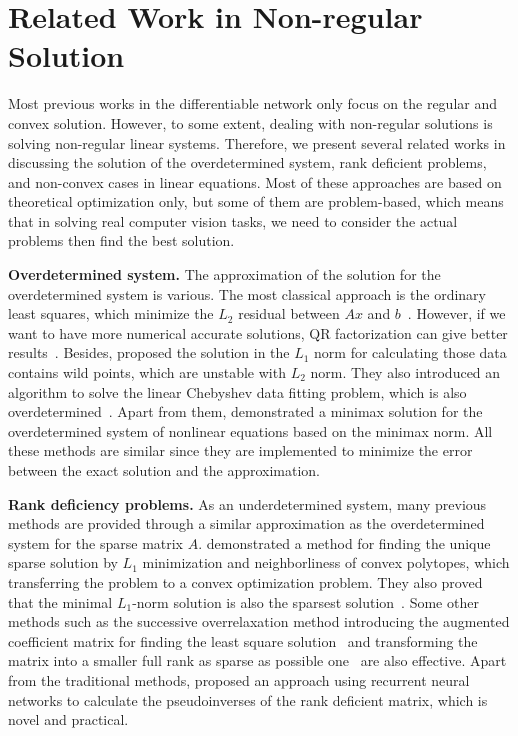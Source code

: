 \section{Related Work in Non-regular Solution}
\label{sec:relatedworknonreg}
Most previous works in the differentiable network only focus on the regular and convex solution. However, to some extent, dealing with non-regular solutions is solving non-regular linear systems. Therefore, we present several related works in discussing the solution of the overdetermined system, rank deficient problems, and non-convex cases in linear equations. Most of these approaches are based on theoretical optimization only, but some of them are problem-based, which means that in solving real computer vision tasks, we need to consider the actual problems then find the best solution. 
\par \textbf{Overdetermined system.} The approximation of the solution for the overdetermined system is various. The most classical approach is the ordinary least squares, which minimize the $L_2$ residual between $Ax$ and $b$~\citep{AH:13}. However, if we want to have more numerical accurate solutions, QR factorization can give better results~\citep{TL:97}. Besides, \cite{BI:74} proposed the solution in the $L_1$ norm for calculating those data contains wild points, which are unstable with $L_2$ norm. They also introduced an algorithm to solve the linear Chebyshev data fitting problem, which is also overdetermined~\citep{BI:75}. Apart from them, \cite{WG:79} demonstrated a minimax solution for the overdetermined system of nonlinear equations based on the minimax norm. All these methods are similar since they are implemented to minimize the error between the exact solution and the approximation. 
\par \textbf{Rank deficiency problems.} As an underdetermined system, many previous methods are provided through a similar approximation as the overdetermined system for the sparse matrix $A$. \cite{DD:05} demonstrated a method for finding the unique sparse solution by $L_1$ minimization and neighborliness of convex polytopes, which transferring the problem to a convex optimization problem. They also proved that the minimal $L_1$-norm solution is also the sparsest solution~\citep{DD:06}. Some other methods such as the successive overrelaxation method introducing the augmented coefficient matrix for finding the least square solution~\citep{DM:06} and transforming the matrix into a smaller full rank as sparse as possible one~\citep{WX:04} are also effective. Apart from the traditional methods, \cite{WJ:97} proposed an approach using recurrent neural networks to calculate the pseudoinverses of the rank deficient matrix, which is novel and practical. 
